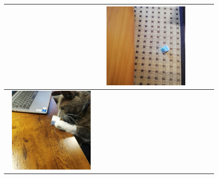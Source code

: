 \documentclass[paper=a4paper,jafontsize=9pt,head_space=15mm,gutter=20mm,
twocolumn,number_of_lines=49, line_length=26zw]{myuarticle}
\begin{document}
\begin{figure}[t]
\begin{tabular}{|c|c|c|c|c|}
\begin{minipage}[c]{0.15\textwidth}
    \end{minipage} &
    \begin{minipage}[c]{0.15\textwidth}
      \centering
      \includegraphics[width=0.9\textwidth]{resources/fall.jpg}
    \end{minipage}
    \\ \hline
    \begin{minipage}[c]{0.15\textwidth}
      \centering
      \includegraphics[width=0.9\textwidth]{resources/cat_after.jpg}

\end{minipage}
\end{tabular}
\end{figure}
\end{document}
